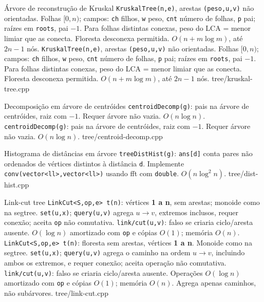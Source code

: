 \templateentry
{Árvore de reconstrução de Kruskal}
{\texttt{KruskalTree(n,e)}, arestas \texttt{(peso,u,v)} não orientadas. Folhas $[0,n)$; campos: \texttt{ch} filhos, \texttt{w} peso, \texttt{cnt} número de folhas, \texttt{p} pai; raízes em \texttt{roots}, pai $-1$. Para folhas distintas conexas, peso do LCA = menor limiar que as conecta. Floresta desconexa permitida. $O(n+m\log m)$, até $2n-1$ nós.}
{\texttt{KruskalTree(n,e)}, arestas \texttt{(peso,u,v)} não orientadas. Folhas $[0,n)$; campos: \texttt{ch} filhos, \texttt{w} peso, \texttt{cnt} número de folhas, \texttt{p} pai; raízes em \texttt{roots}, pai $-1$. Para folhas distintas conexas, peso do LCA = menor limiar que as conecta. Floresta desconexa permitida. $O(n+m\log m)$, até $2n-1$ nós.}
{tree/kruskal-tree.cpp}

\ifextended

\templateentry
{Decomposição em árvore de centróides}
{\texttt{centroidDecomp(g)}: pais na árvore de centróides, raiz com $-1$. Requer árvore não vazia. $O(n\log n)$.}
{\texttt{centroidDecomp(g)}: pais na árvore de centróides, raiz com $-1$. Requer árvore não vazia. $O(n\log n)$.}
{tree/centroid-decomp.cpp}

\templateentry
{Histograma de distâncias em árvore}
{}
{\texttt{treeDistHist(g)}: \texttt{ans[d]} conta pares não ordenados de vértices distintos à distância \texttt{d}. Implemente \texttt{conv(vector<ll>,\allowbreak vector<ll>)} usando fft com \texttt{double}. $O(n \log^2 n)$.}
{tree/dist-hist.cpp}

\fi

\templateentry
{Link-cut tree}
{\texttt{LinkCut<S,op,e> t(n)}: vértices \textbf{1 a n}, sem arestas; monoide como na segtree. \texttt{set(u,x)}; \texttt{query(u,v)} agrega $u\to v$, extremos inclusos, requer conexão; aceita \texttt{op} não comutativa. \texttt{link/cut(u,v)}: falso se criaria ciclo/aresta ausente. $O(\log n)$ amortizado com \texttt{op} e cópias $O(1)$; memória $O(n)$.}
{\texttt{LinkCut<S,op,e> t(n)}: floresta sem arestas, vértices \textbf{1 a n}. Monoide como na segtree. \texttt{set(u,x)}; \texttt{query(u,v)} agrega o caminho na ordem $u\to v$, incluindo ambos os extremos, e requer conexão; aceita operação não comutativa. \texttt{link/cut(u,v)}: falso se criaria ciclo/aresta ausente. Operações $O(\log n)$ amortizado com \texttt{op} e cópias $O(1)$; memória $O(n)$. Agrega apenas caminhos, não subárvores.}
{tree/link-cut.cpp}
